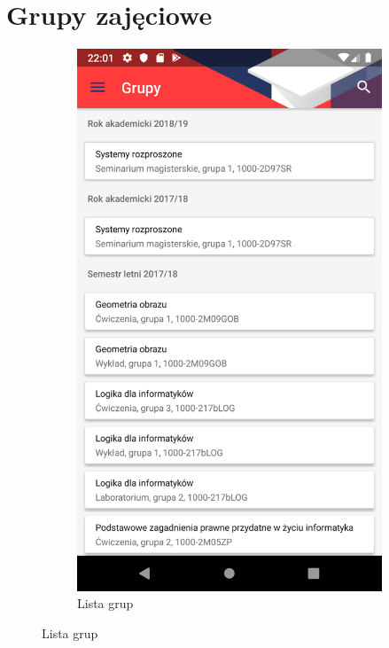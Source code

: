\documentclass{pracamgr}
\begin{document}
\section{Grupy zajęciowe}

\begin{figure}[p]
	\centering
	\begin{subfigure}[t]{0.3\textwidth}
		\includegraphics[width=\textwidth]{img/groups_list.png}
		\caption{Lista grup}
		\label{fig:groups_list}
	\end{subfigure}

\end{figure}
\end{document}
